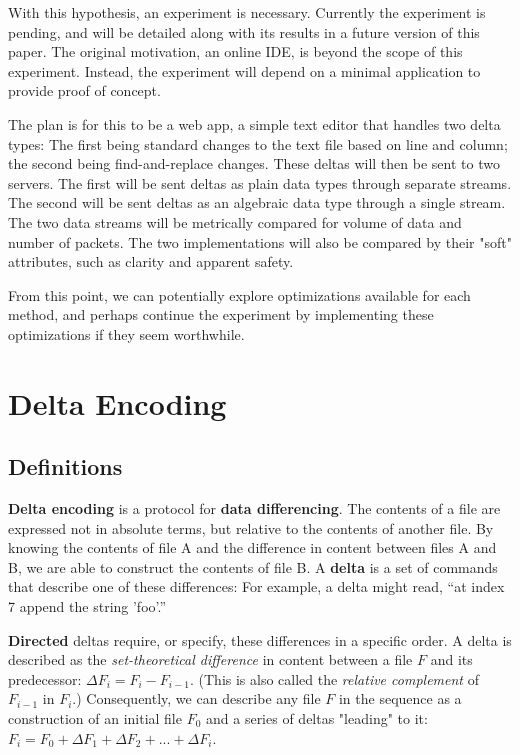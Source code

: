 \documentclass[12pt,a4paper]{article}
\begin{document}
	With this hypothesis, an experiment is necessary. Currently the experiment is pending, and will be detailed along with its results in a future version of this paper. The original motivation, an online IDE, is beyond the scope of this experiment. Instead, the experiment will depend on a minimal application to provide proof of concept. 
	
	The plan is for this to be a web app, a simple text editor that handles two delta types: The first being standard changes to the text file based on line and column; the second being find-and-replace changes. These deltas will then be sent to two servers. The first will be sent deltas as plain data types through separate streams. The second will be sent deltas as an algebraic data type through a single stream. The two data streams will be metrically compared for volume of data and number of packets. The two implementations will also be compared by their "soft" attributes, such as clarity and apparent safety.
	
	From this point, we can potentially explore optimizations available for each method, and perhaps continue the experiment by implementing these optimizations if they seem worthwhile.
	
	\pagebreak
	\section{Delta Encoding}
		
		\subsection{Definitions}
		
		\textbf{Delta encoding} is a protocol for \textbf{data differencing}. The contents of a file are expressed not in absolute terms, but relative to the contents of another file. By knowing the contents of file A and the difference in content between files A and B, we are able to construct the contents of file B. A \textbf{delta} is a set of commands that describe one of these differences: For example, a delta might read, \textquotedblleft at index 7 append the string 'foo'.\textquotedblright
		
		\textbf{Directed} deltas require, or specify, these differences in a specific order. A delta is described as the \textit{set-theoretical difference} in content between a file $F$ and its predecessor: $\Delta F_i = F_i - F_{i-1}$. (This is also called the \textit{relative complement} of $F_{i-1}$ in $F_i$.) Consequently, we can describe any file $F$ in the sequence as a construction of an initial file $F_0$ and a series of deltas "leading" to it: $F_i = F_0 + \Delta F_1 + \Delta F_2 + ... + \Delta F_i$.
		
\end{document}

